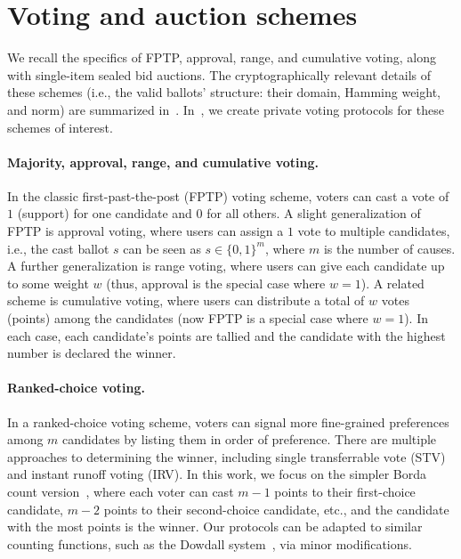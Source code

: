 \section{Voting and auction schemes}

We recall the specifics of FPTP, approval, range, and cumulative voting, along with single-item sealed bid auctions. The cryptographically relevant details of these schemes (i.e., the valid ballots' structure: their domain, Hamming weight, and norm) are summarized in~. In~, we create private voting protocols for these schemes of interest.



\paragraph{Majority, approval, range, and cumulative voting.} 
In the classic first-past-the-post (FPTP) voting scheme, voters can cast a vote of $1$ (support) for one candidate and $0$ for all others. A slight generalization of FPTP is approval voting, where users can assign a $1$ vote to multiple candidates, i.e., the cast ballot $s$ can be seen as $s\in\{0,1\}^{m}$, where $m$ is the number of causes. A further generalization is range voting, where users can give each candidate up to some weight $w$ (thus, approval is the special case where $w=1$). A related scheme is cumulative voting, where users can distribute a total of $w$ votes (points) among the candidates (now FPTP is a special case where $w=1$).
In each case, each candidate's points are tallied and the candidate with the highest number is declared the winner.

\paragraph{Ranked-choice voting.} 
In a ranked-choice voting scheme, voters can signal more fine-grained preferences among $m$ candidates by listing them in order of preference. There are multiple approaches to determining the winner, including single transferrable vote (STV) and instant runoff voting (IRV). In this work, we focus on the simpler Borda count version~\cite{Emerson13}, where each voter can cast $m-1$ points to their first-choice candidate, $m-2$ points to their second-choice candidate, etc., and the candidate with the most points is the winner. Our protocols can be adapted to similar counting functions, such as the Dowdall system~\cite{FraGro14}, via minor modifications.


